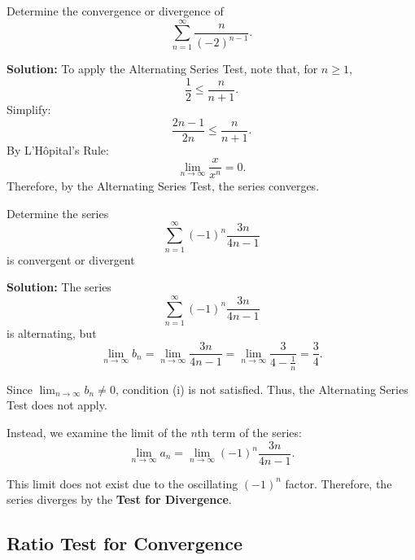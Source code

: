 \documentclass[12pt]{article}
\theoremstyle{beautifulthm}
\begin{document}
\begin{tcolorbox}[colback=examplebg, colframe=red!75!black, title=\textbf{EXAMPLE 2: Using the Alternating Series Test}, fonttitle=\bfseries, sharp corners]

Determine the convergence or divergence of
\[
\sum_{n=1}^\infty \frac{n}{(-2)^{n-1}}.
\]

\tcblower
\textbf{Solution:} 
To apply the Alternating Series Test, note that, for $n \geq 1$,
\[
\frac{1}{2} \leq \frac{n}{n+1}.
\]
Simplify:
\[
\frac{2n - 1}{2n} \leq \frac{n}{n+1}.
\]
By L’Hôpital's Rule:
\[
\lim_{n\to\infty} \frac{x}{x^n} = 0.
\]
Therefore, by the Alternating Series Test, the series converges.
\end{tcolorbox}

\begin{tcolorbox}[colback=examplebg, colframe=red!75!black, title=\textbf{EXAMPLE 3: Using the Alternating Series Test}, fonttitle=\bfseries, sharp corners]

Determine the series
\[
\sum_{n=1}^\infty (-1)^n \frac{3n}{4n - 1}
\]
is convergent or divergent

\tcblower
\textbf{Solution:} 
The series
\[
\sum_{n=1}^\infty (-1)^n \frac{3n}{4n - 1}
\]
is alternating, but
\[
\lim_{n \to \infty} b_n = \lim_{n \to \infty} \frac{3n}{4n - 1} = \lim_{n \to \infty} \frac{3}{4 - \frac{1}{n}} = \frac{3}{4}.
\]

Since $\lim_{n \to \infty} b_n \neq 0$, condition (i) is not satisfied. Thus, the Alternating Series Test does not apply.

Instead, we examine the limit of the $n$th term of the series:
\[
\lim_{n \to \infty} a_n = \lim_{n \to \infty} (-1)^n \frac{3n}{4n - 1}.
\]

This limit does not exist due to the oscillating $(-1)^n$ factor. Therefore, the series diverges by the \textbf{Test for Divergence}.
\end{tcolorbox}


\subsection{Ratio Test for
Convergence}
\end{document}
